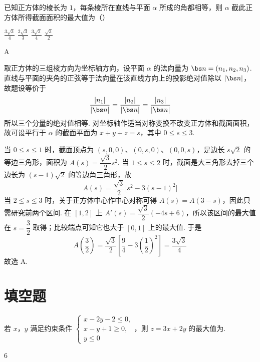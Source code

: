 \begin{problem}
已知正方体的棱长为 \(1\)，每条棱所在直线与平面 \(\alpha\) 所成的角都相等，则 \(\alpha\) 截此正方体所得截面面积的最大值为（\quad）

\choices
    {\(\frac{3\sqrt3}{4}\)}
    {\(\frac{2\sqrt3}{3}\)}
    {\(\frac{3\sqrt2}{4}\)}
    {\(\frac{\sqrt3}{2}\)}
\end{problem}

\begin{answer}
A
\end{answer}

\begin{solution}
取正方体的三组棱方向为坐标轴方向，设平面 \(\alpha\) 的法向量为 \(\bs n=(n_1,n_2,n_3)\). 直线与平面的夹角的正弦等于法向量在该直线方向上的投影绝对值除以 \(\lvert\bs n\rvert\)，故题设等价于
\[
\frac{|n_1|}{|\bs n|}=\frac{|n_2|}{|\bs n|}=\frac{|n_3|}{|\bs n|}
\]
所以三个分量的绝对值相等. 对坐标轴作适当对称变换不改变正方体和截面面积，故可设平行于 \(\alpha\) 的截面平面为 \(x+y+z=s\)，其中 \(0\le s\le3\).

当 \(0\le s\le1\) 时，截面顶点为 \((s,0,0)\)、\((0,s,0)\)、\((0,0,s)\)，是边长 \(s\sqrt2\) 的等边三角形，面积为 \(A(s)=\dfrac{\sqrt3}{2}s^2\). 当 \(1\le s\le2\) 时，截面是大三角形去掉三个边长为 \((s-1)\sqrt2\) 的等边角三角形，故
\[
A(s)=\frac{\sqrt3}{2}\bigl[s^2-3(s-1)^2\bigr]
\]
当 \(2\le s\le3\) 时，关于正方体中心作中心对称可得 \(A(s)=A(3-s)\)，因此只需研究前两个区间. 在 \([1,2]\) 上 \(A'(s)=\dfrac{\sqrt3}{2}(-4s+6)\)，所以该区间的最大值在 \(s=\dfrac32\) 取得；比较端点可知它也大于 \([0,1]\) 上的最大值. 于是
\[
A\left(\frac32\right)=\frac{\sqrt3}{2}\left[\frac94-3\left(\frac12\right)^2\right]=\frac{3\sqrt3}{4}
\]
故选 A.
\end{solution}

\section{填空题}

\begin{problem}
若 \(x\)，\(y\) 满足约束条件 \(\begin{cases}
x-2y-2\le0,\\
x-y+1\ge0,\\
y\le0
\end{cases}\)，则 \(z=3x+2y\) 的最大值为\fillinblank{}.
\end{problem}

\begin{answer}
6
\end{answer}


